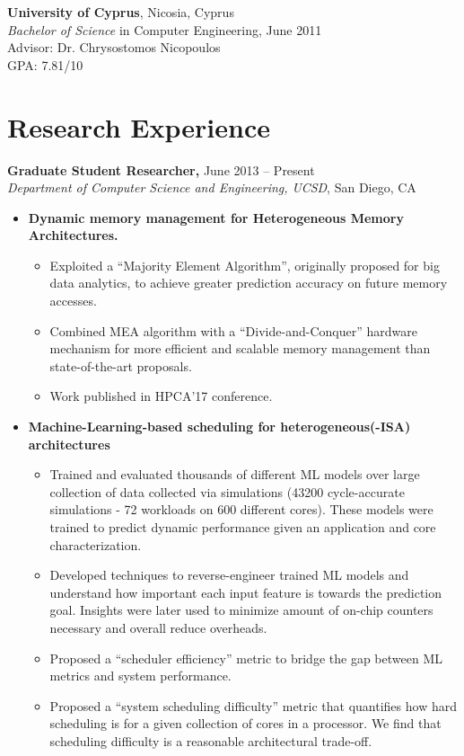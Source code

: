 \documentclass[11pt]{myres} %
\begin{document}
\begin{resume}
	{\color{blue}\textbf{University of Cyprus}, Nicosia, Cyprus} \\
	\emph{Bachelor of Science} in Computer Engineering, June 2011 \\
	Advisor: Dr. Chrysostomos Nicopoulos \\
	GPA: 7.81/10

\section{Research Experience}

{\color{blue}\textbf{Graduate Student Researcher,} June 2013 -- Present} \\
\emph{Department of Computer Science and Engineering, UCSD}, San Diego, CA \\
\begin{itemize} \itemsep -2pt
    \item \textbf{Dynamic memory management for Heterogeneous Memory Architectures.}
    \begin{itemize}
        \item Exploited a ``Majority Element Algorithm'', originally proposed for big data analytics, to achieve greater prediction accuracy on future memory accesses.
        \item Combined MEA algorithm with a ``Divide-and-Conquer'' hardware mechanism for more efficient and scalable memory management than state-of-the-art proposals.
        \item Work published in HPCA'17 conference.
    \end{itemize}
    \item \textbf{Machine-Learning-based scheduling for heterogeneous(-ISA) architectures }
    \begin{itemize}
        \item Trained and evaluated thousands of different ML models over large collection of data collected via simulations (43200 cycle-accurate simulations - 72 workloads on 600 different cores). These models were trained to predict dynamic performance given an application and core characterization.
        \item Developed techniques to reverse-engineer trained ML models and understand how important each input feature is towards the prediction goal. Insights were later used to minimize amount of on-chip counters necessary and overall reduce overheads.
        \item Proposed a ``scheduler efficiency'' metric to bridge the gap between ML metrics and system performance.
        \item Proposed a ``system scheduling difficulty'' metric that quantifies how hard scheduling is for a given collection of cores in a processor. We find that scheduling difficulty is a reasonable architectural trade-off.
    \end{itemize}
\end{itemize}


\end{resume}
\end{document}
